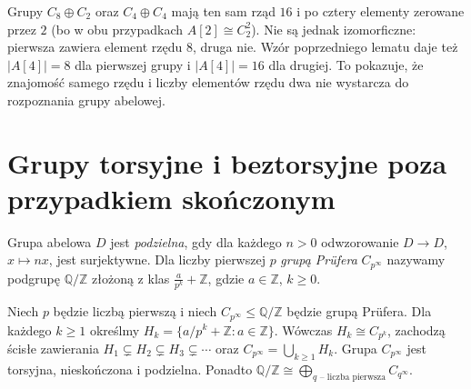 \begin{przyklad}
\label{aa:prz:abelian-order16}
Grupy $C_8\oplus C_2$ oraz $C_4\oplus C_4$ mają ten sam
rząd $16$ i po cztery elementy zerowane przez $2$
(bo w obu przypadkach $A[2]\cong C_2^2$).
Nie są jednak izomorficzne: pierwsza zawiera element
rzędu $8$, druga nie. Wzór poprzedniego lematu daje też
$|A[4]|=8$ dla pierwszej grupy i $|A[4]|=16$ dla drugiej.
To pokazuje, że znajomość samego rzędu i liczby elementów
rzędu dwa nie wystarcza do rozpoznania grupy abelowej.
\end{przyklad}

\section{Grupy torsyjne i beztorsyjne poza przypadkiem skończonym}
\begin{definicja}
\label{aa:def:divisible-prufer}
Grupa abelowa $D$ jest \emph{podzielna}, gdy dla każdego
$n>0$ odwzorowanie $D\to D$, $x\mapsto nx$, jest surjektywne.
Dla liczby pierwszej $p$ \emph{grupą Prüfera} $C_{p^\infty}$
nazywamy podgrupę $\mathbb Q/\mathbb Z$ złożoną z klas
$\frac{a}{p^k}+\mathbb Z$, gdzie $a\in\mathbb Z$, $k\ge0$.
\end{definicja}
\begin{stwierdzenie}
\label{aa:st:prufer-properties}
Niech $p$ będzie liczbą pierwszą i niech
$C_{p^\infty}\le\mathbb Q/\mathbb Z$ będzie grupą Prüfera.
Dla każdego $k\ge1$ określmy
$H_k=\{a/p^k+\mathbb Z:a\in\mathbb Z\}$.
Wówczas $H_k\cong C_{p^k}$, zachodzą ścisłe zawierania
$H_1\subsetneq H_2\subsetneq H_3\subsetneq\cdots$ oraz
$C_{p^\infty}=\bigcup_{k\ge1}H_k$.
Grupa $C_{p^\infty}$ jest torsyjna, nieskończona i podzielna.
Ponadto $\mathbb Q/\mathbb Z\cong
\bigoplus_{q\text{ -- liczba pierwsza}} C_{q^\infty}$.
\end{stwierdzenie}
